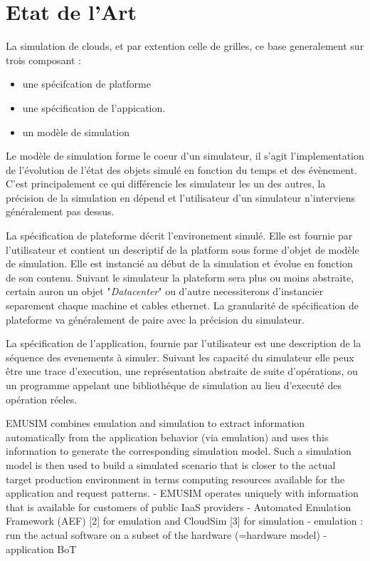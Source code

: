 \documentclass[parallelisme]{compas2017}
\begin{document}
\section{Etat de l'Art}

La simulation de clouds, et par extention celle de grilles, ce base generalement
sur trois composant :
\begin{itemize}
		\item une spécifcation de platforme
		\item une spécification de l'appication.
		\item un modèle de simulation
\end{itemize}

Le modèle de simulation forme le coeur d'un simulateur, il s'agit
l'implementation de l'évolution de l'état des objets simulé en fonction du temps
et des évènement. C'est principalement ce qui différencie les simulateur les un
des autres, la précision de la simulation en dépend et l'utilisateur d'un
simulateur n'interviens généralement pas dessus.

La spécification de plateforme décrit l'environement simulé. Elle est fournie
par l'utilisateur et contient un descriptif de la platform sous forme d'objet de
modèle de simulation. Elle est instancié au début de la simulation et évolue en
fonction de son contenu. Suivant le simulateur la plateform sera plus ou moins
abstraite, certain auron un objet "\emph{Datacenter}" ou d'autre necessiterons
d'instancier separement chaque machine et cables ethernet. La granularité de
spécification de plateforme va généralement de paire avec la précision du
simulateur.

La spécification de l'application, fournie par l'utilisateur est une description
de la séquence des evenements à simuler. Suivant les capacité du simulateur elle
peux être une trace d'execution, une représentation abstraite de suite
d'opérations, ou un programme appelant une bibliothéque de simulation au lieu
d'executé des opération réeles.




EMUSIM combines  emulation and  simulation to extract  information automatically
from  the application  behavior (via  emulation)  and uses  this information  to
generate the  corresponding simulation  model. Such a  simulation model  is then
used  to  build  a simulated  scenario  that  is  closer  to the  actual  target
production  environment   in  terms   computing  resources  available   for  the
application and request patterns.
- EMUSIM operates uniquely with information that is available for customers of public IaaS providers
- Automated Emulation Framework (AEF) [2] for emulation and CloudSim [3] for simulation
- emulation : run the actual software on a subset of the hardware (=hardware model)
- application BoT
\end{document}
